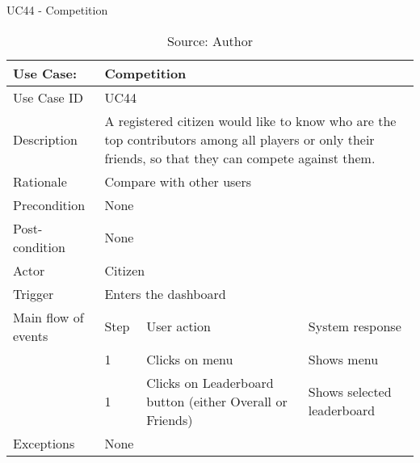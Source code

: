 \begin{table}[h]
\centering
\caption{UC44 - Competition}
\label{uc:44}
\begin{tabular}{|p{3cm}|p{1cm}|p{5cm}|p{5cm}|}
\hline
Use Case:       & \multicolumn{3}{p{11cm}|}{Competition} \\ \hline
Use Case ID     & \multicolumn{3}{p{11cm}|}{UC44} \\ \hline
Description     & \multicolumn{3}{p{11cm}|}{A registered citizen would like to know who are the top contributors among all players or only their friends, so that they can compete against them.} \\ \hline
Rationale       & \multicolumn{3}{p{11cm}|}{Compare with other users} \\ \hline
Precondition    & \multicolumn{3}{p{11cm}|}{None} \\ \hline
Post-condition  & \multicolumn{3}{p{11cm}|}{None} \\ \hline
Actor           & \multicolumn{3}{p{11cm}|}{Citizen} \\ \hline
Trigger         & \multicolumn{3}{p{11cm}|}{Enters the dashboard} \\ \hline
Main flow of events & Step  & User action & System response \\ \hline
                    & 1     & Clicks on menu & Shows menu \\ \hline
                    & 1     & Clicks on Leaderboard button (either Overall or Friends) & Shows selected leaderboard \\ \hline
Exceptions      & \multicolumn{3}{p{11cm}|}{None} \\ \hline
\end{tabular}
\caption*{Source: Author}
\end{table}

